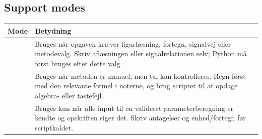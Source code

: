 \subsection{Support modes}

\begin{tabularx}{\textwidth}{@{}p{}Y@{}}
\toprule
Mode & Betydning \\
\midrule
{} & Bruges når opgaven kræver figurlæsning, fortegn, signalvej eller metodevalg. Skriv aflæsningen eller signalrelationen selv; Python må først bruges efter dette valg.\\
 & Bruges når metoden er manuel, men tal kan kontrolleres. Regn først med den relevante formel i noterne, og brug scriptet til at opdage algebra- eller tastefejl.\\
 & Bruges kun når alle input til en valideret parameterberegning er kendte og opskriften siger det. Skriv antagelser og enhed/fortegn før scriptkaldet.\\
\bottomrule
\end{tabularx}
